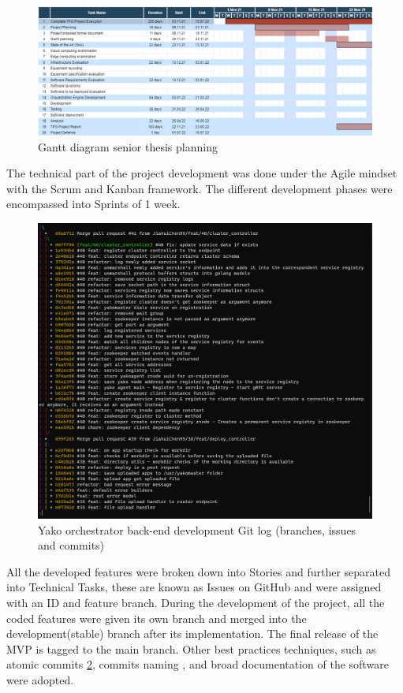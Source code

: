         \begin{figure}[H]
            \centering
            \includegraphics[width=\linewidth]{Images/gantt planning.png}
            \caption{Gantt diagram senior thesis planning}
            \label{fig:gantt}
        \end{figure}
    
        The technical part of the project development was done under the Agile mindset \cite{agile_manifesto_manifesto_nodate} with the Scrum \cite{scrum_guides_scrum_nodate} and Kanban framework. The different development phases were encompassed into Sprints of 1 week.

        \begin{figure}[H]
            \centering
            \includegraphics[width=0.6\linewidth]{Images/branches.png}
            \caption{Yako orchestrator back-end development Git log (branches, issues and commits)}
            \label{fig:branches}
        \end{figure}
        
        All the developed features were broken down into Stories and further separated into Technical Tasks, these are known as Issues on GitHub and were assigned with an ID and feature branch.
        During the development of the project, all the coded features were given its own branch and merged into the development(stable) branch after its implementation. The final release of the MVP is tagged to the main branch. Other best practices techniques, such as atomic commits \ref{fig:branches}, commits naming \cite{conventional_commits_conventional_nodate}, and broad documentation of the software were adopted.
        
